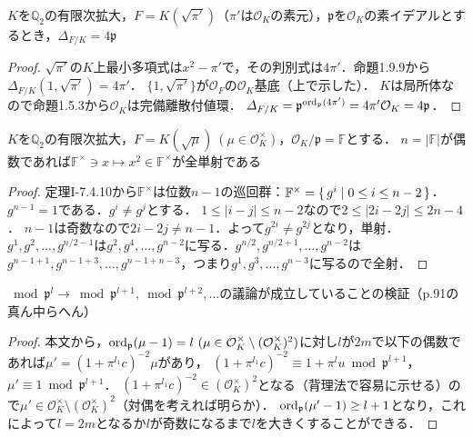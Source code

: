 \begin{screen}
  $K$を$\mathbb{Q}_2$の有限次拡大，$F=K(\sqrt{\pi'})$（$\pi'$は$\mathcal{O}_K$の素元），$\mathfrak{p}$を$\mathcal{O}_K$の素イデアルとするとき，$\varDelta_{F/K}=4\mathfrak{p}$
\end{screen}
\begin{proof}
  $\sqrt{\pi'}$の$K$上最小多項式は$x^2-\pi'$で，その判󠄁󠄁別式は$4\pi'$．命題1.9.9から$\varDelta_{F/K}(1,\sqrt{\pi'})=4\pi'$．
  $\{1,\sqrt{\pi'}\}$が$\mathcal{O}_F$の$\mathcal{O}_K$基底（上で示した）．
  $K$は局所体なので命題1.5.3から$\mathcal{O}_K$は完備離散付値環．
  $\varDelta_{F/K}=\mathfrak{p}^{\operatorname{ord}_\mathfrak{p}(4\pi')}=4\pi'\mathcal{O}_K=4\mathfrak{p}$．
\end{proof}

\begin{screen}
  $K$を$\mathbb{Q}_2$の有限次拡大，$F=K(\sqrt{\mu})\ (\mu\in\mathcal{O}_K^\times)$，$\mathcal{O}_K/\mathfrak{p}=\mathbb{F}$とする．
  $n=\lvert\mathbb{F}\rvert$が偶数であれば$\mathbb{F}^\times\ni x\mapsto x^2\in\mathbb{F}^\times$が全単射である
\end{screen}
\begin{proof}
  定理I-7.4.10から$\mathbb{F}^\times$は位数$n-1$の巡回群：$\mathbb{F}^\times=\set{g^i | 0\leq i\leq n-2}$．
  $g^{n-1}=1$である．$g^i\neq g^j$とする．
  $1\leq\lvert i-j\rvert\leq n-2$なので$2\leq\lvert 2i-2j\rvert\leq 2n-4$．
  $n-1$は奇数なので$2i-2j\neq n-1$．よって$g^{2i}\neq g^{2j}$となり，単射．
  $g^1,g^2,\ldots,g^{n/2-1}$は$g^2,g^4,\ldots,g^{n-2}$に写る．$g^{n/2},g^{n/2+1},\ldots,g^{n-2}$は$g^{n-1+1},g^{n-1+3},\ldots,g^{n-1+n-3}$，つまり$g^1,g^3,\ldots,g^{n-3}$に写るので全射．
\end{proof}

\begin{screen}
  $\bmod\mathfrak{p}^l \to \bmod\mathfrak{p}^{l+1}, \bmod\mathfrak{p}^{l+2}, \ldots$の議論が成立していることの検証（p.91の真ん中らへん）
\end{screen}
\begin{proof}
  本文から，$\ord_\mathfrak{p}(\mu-1)=l\ (\mu\in\mathcal{O}_K^\times\setminus(\mathcal{O}_K^\times)^2)$に対し$l$が$2m$で以下の偶数であれば$\mu'=(1+\pi^{l_1}c)^{-2}\mu$があり，
  $(1+\pi^{l_1}c)^{-2}\equiv 1+\pi^lu\bmod\mathfrak{p}^{l+1}$，$\mu'\equiv 1\bmod\mathfrak{p}^{l+1}$．
  $(1+\pi^{l_1}c)^{-2}\in(\mathcal{O}_K^\times)^2$となる（背理法で容易に示せる）ので$\mu'\in\mathcal{O}_K^\times\setminus(\mathcal{O}_K^\times)^2$（対偶を考えれば明らか）．
  $\operatorname{ord}_\mathfrak{p}(\mu'-1)\geq l+1$となり，これによって$l=2m$となるか$l$が奇数になるまで$l$を大きくすることができる．
\end{proof}

